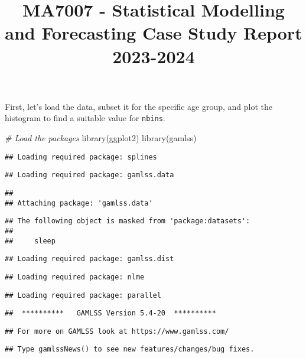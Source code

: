 \documentclass[
]{article}
\title{MA7007 - Statistical Modelling and Forecasting Case Study Report
2023-2024}
\author{}
\date{\vspace{-2.5em}}
\newenvironment{Shaded}{\begin{snugshade}}{\end{snugshade}}
\newcommand{\CommentTok}[1]{\textcolor[rgb]{0.56,0.35,0.01}{\textit{#1}}}
\newcommand{\FunctionTok}[1]{\textcolor[rgb]{0.00,0.00,0.00}{#1}}
\newcommand{\NormalTok}[1]{#1}
\begin{document}
\maketitle

First, let's load the data, subset it for the specific age group, and
plot the histogram to find a suitable value for \texttt{nbins}.

\begin{Shaded}
\begin{Highlighting}[]
\CommentTok{\# Load the packages}
\FunctionTok{library}\NormalTok{(ggplot2)}
\FunctionTok{library}\NormalTok{(gamlss)}
\end{Highlighting}
\end{Shaded}

\begin{verbatim}
## Loading required package: splines
\end{verbatim}

\begin{verbatim}
## Loading required package: gamlss.data
\end{verbatim}

\begin{verbatim}
## 
## Attaching package: 'gamlss.data'
\end{verbatim}

\begin{verbatim}
## The following object is masked from 'package:datasets':
## 
##     sleep
\end{verbatim}

\begin{verbatim}
## Loading required package: gamlss.dist
\end{verbatim}

\begin{verbatim}
## Loading required package: nlme
\end{verbatim}

\begin{verbatim}
## Loading required package: parallel
\end{verbatim}

\begin{verbatim}
##  **********   GAMLSS Version 5.4-20  **********
\end{verbatim}

\begin{verbatim}
## For more on GAMLSS look at https://www.gamlss.com/
\end{verbatim}

\begin{verbatim}
## Type gamlssNews() to see new features/changes/bug fixes.
\end{verbatim}
\end{document}

